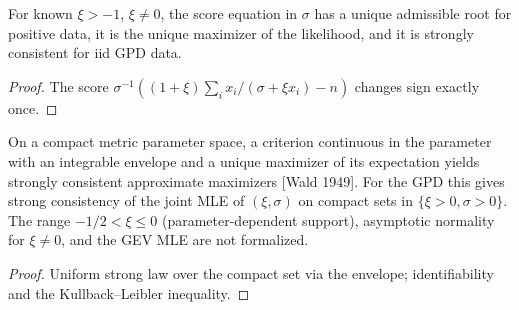\begin{theorem}
  \label{thm:mle-scale}
  \leanok
  For known $\xi > -1$, $\xi \ne 0$, the score equation in $\sigma$ has a unique admissible root for positive data, it is the
  unique maximizer of the likelihood, and it is strongly consistent for iid GPD data.
\end{theorem}
\begin{proof}
  \leanok
  The score $\sigma^{-1}((1 + \xi)\sum_i x_i/(\sigma + \xi x_i) - n)$ changes sign exactly once.
\end{proof}

\begin{theorem}
  \label{thm:wald}
  \leanok
  On a compact metric parameter space, a criterion continuous in the parameter with an integrable envelope and a
  unique maximizer of its expectation yields strongly consistent approximate maximizers [Wald 1949]. For the GPD
  this gives strong consistency of the joint MLE of $(\xi, \sigma)$ on compact sets in $\{\xi > 0, \sigma > 0\}$. The range
  $-1/2 < \xi \le 0$ (parameter-dependent support), asymptotic normality for $\xi \ne 0$, and the GEV MLE are not formalized.
\end{theorem}
\begin{proof}
  \leanok
  Uniform strong law over the compact set via the envelope; identifiability and the Kullback--Leibler inequality.
\end{proof}

